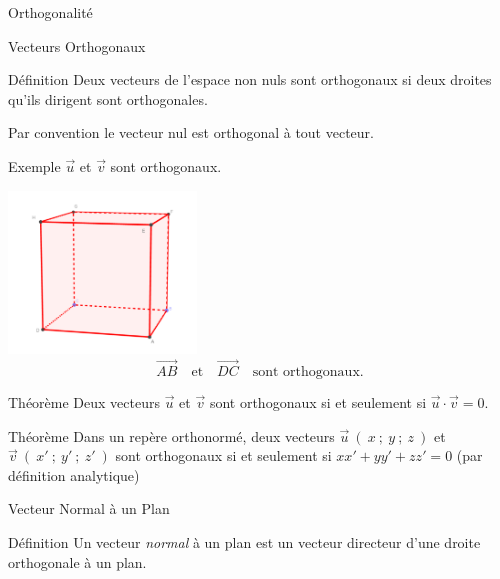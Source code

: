 \documentclass{cours}
\begin{document}
    \pagebreak
    \begin{Gpartie}{Orthogonalité} 
        \begin{Spartie}{Vecteurs Orthogonaux} 
            \begin{SSpartie}{Définition} 
                Deux vecteurs de l'espace non nuls sont orthogonaux si deux droites qu'ils dirigent sont orthogonales.

                Par convention le vecteur nul est orthogonal à tout vecteur.

                \begin{SSSpartie}{Exemple} 
                    $\vec{u}$ et $\vec{v}$ sont orthogonaux.

                    \begin{center}
                            \includegraphics[width=5cm]{rsc/12fig2.png}
                            \[\overrightarrow{AB}\quad\text{et}\quad\overrightarrow{DC}\quad\text{sont orthogonaux.}\]
                        \parbox{\linewidth}{}
                    \end{center}
                \end{SSSpartie}
            \end{SSpartie}
            \begin{SSpartie}{Théorème} 
                Deux vecteurs $\vec{u}$ et $\vec{v}$ sont orthogonaux si et seulement si $\vec{u}\cdot\vec{v}=0$.
            \end{SSpartie}
            \begin{SSpartie}{Théorème} 
                Dans un repère orthonormé, deux vecteurs $\vec{u}~\left(~x~;~y~;~z~\right)$ et $\vec{v}~\left(~x'~;~y'~;~z'~\right)$ sont orthogonaux si et seulement si $xx'+yy'+zz'=0$ (par définition analytique)
            \end{SSpartie}
        \end{Spartie}
        \pagebreak
        \begin{Spartie}{Vecteur Normal à un Plan} 
            \begin{SSpartie}{Définition} 
                Un vecteur \emph{normal} à un plan est un vecteur directeur d'une droite orthogonale à un plan.
    

\end{SSpartie}
\end{Spartie}
\end{Gpartie}
\end{document}
